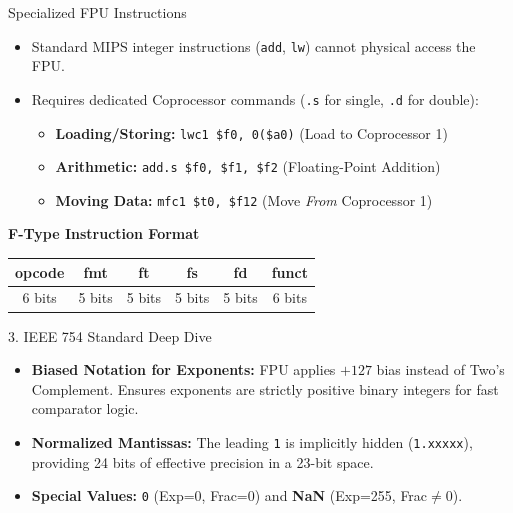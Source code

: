 \documentclass[aspectratio=169]{beamer}
\begin{document}
\begin{frame}{Specialized FPU Instructions}
\begin{itemize}
    \item Standard MIPS integer instructions (\texttt{add}, \texttt{lw}) cannot physical access the FPU.
    \item Requires dedicated Coprocessor commands (\texttt{.s} for single, \texttt{.d} for double):
    \vspace{0.2cm}
    \begin{itemize}
        \item \textbf{Loading/Storing:} \texttt{lwc1 \$f0, 0(\$a0)} (Load to Coprocessor 1)
        \item \textbf{Arithmetic:} \texttt{add.s \$f0, \$f1, \$f2} (Floating-Point Addition)
        \item \textbf{Moving Data:} \texttt{mfc1 \$t0, \$f12} (Move \textit{From} Coprocessor 1)
    \end{itemize}
\end{itemize}
\vspace{0.4cm}
\begin{center}
    \textbf{F-Type Instruction Format} \\
    \vspace{0.2cm}
    \begin{tabular}{|c|c|c|c|c|c|}
        \hline
        \textbf{opcode} & \textbf{fmt} & \textbf{ft} & \textbf{fs} & \textbf{fd} & \textbf{funct} \\
        \hline
        6 bits & 5 bits & 5 bits & 5 bits & 5 bits & 6 bits \\
        \hline
    \end{tabular}
\end{center}
\end{frame}

\begin{frame}{3. IEEE 754 Standard Deep Dive}
\begin{itemize}
    \item \textbf{Biased Notation for Exponents:} FPU applies $+127$ bias instead of Two's Complement. Ensures exponents are strictly positive binary integers for fast comparator logic.
    \item \textbf{Normalized Mantissas:} The leading \texttt{1} is implicitly hidden (\texttt{1.xxxxx}), providing 24 bits of effective precision in a 23-bit space.
    \item \textbf{Special Values:} \texttt{0} (Exp=0, Frac=0) and \textbf{NaN} (Exp=255, Frac$\neq$0).
\end{itemize}
\end{frame}
\end{document}
